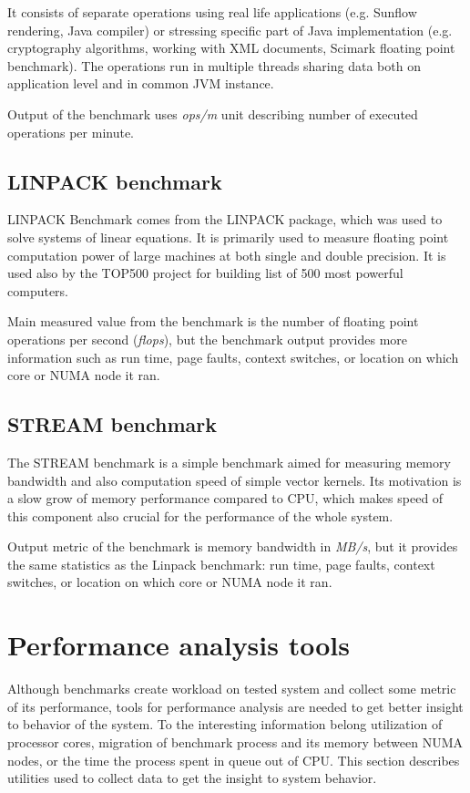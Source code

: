 It consists of separate operations using real life applications (e.g. Sunflow
rendering, Java compiler) or stressing specific part of Java implementation
(e.g. cryptography algorithms, working with XML documents, Scimark floating
point benchmark). The operations run in multiple threads sharing data both on
application level and in common JVM instance.

Output of the benchmark uses \emph{ops/m} unit describing number of executed
operations per minute.

\subsection{LINPACK benchmark}
LINPACK Benchmark\cite{linpack} comes from the LINPACK package, which was used to
solve systems of linear equations. It is primarily
used to measure floating point computation power of large machines at both
single and double precision. It is used also by the TOP500 project for building list
of 500 most powerful computers.

Main measured value from the benchmark is the number of floating point operations per
second (\emph{flops}), but the benchmark output provides more information such as
run time, page faults, context switches, or location on which core or NUMA node
it ran.

\subsection{STREAM benchmark}
The STREAM benchmark\;\cite{stream} is a simple benchmark aimed for measuring memory
bandwidth and also computation speed of simple vector kernels. Its motivation is a
slow grow of memory performance compared to CPU, which makes speed of this
component also crucial for the performance of the whole system.

Output metric of the benchmark is memory bandwidth in \emph{MB/s}, but it
provides the same statistics as the Linpack benchmark: run time, page faults,
context switches, or location on which core or NUMA node it ran.

\section{Performance analysis tools}
Although benchmarks create workload on tested system and collect some metric of
its performance, tools for performance analysis are needed to get better insight
to behavior of the system. To the interesting information belong utilization of
processor cores, migration of benchmark process and its memory between NUMA
nodes, or the time the process spent in queue out of CPU.
This section describes utilities used to collect data to get the insight to
system behavior.

